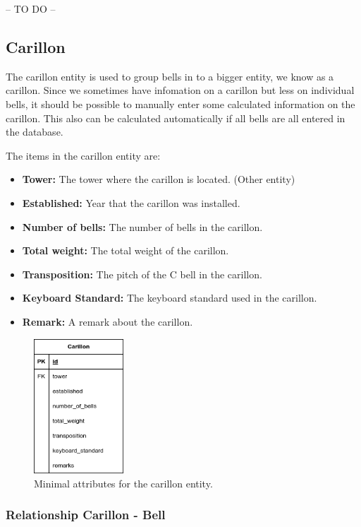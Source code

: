 \documentclass[11pt, a4paper]{article}
\begin{document}
-- TO DO --

\subsection{Carillon}

The carillon entity is used to group bells in to a bigger entity, we know as a carillon. Since we sometimes have infomation on a carillon but less on individual bells,
it should be possible to manually enter some calculated information on the carillon.
This also can be calculated automatically if all bells are all entered in the database. 

The items in the carillon entity are:

\begin{itemize}
    \item \textbf{Tower:} The tower where the carillon is located. (Other entity)
    \item \textbf{Established:} Year that the carillon was installed.
    \item \textbf{Number of bells:} The number of bells in the carillon.
    \item \textbf{Total weight:} The total weight of the carillon.
    \item \textbf{Transposition:} The pitch of the C bell in the carillon.
    \item \textbf{Keyboard Standard:} The keyboard standard used in the carillon.
    \item \textbf{Remark:} A remark about the carillon.
\end{itemize}

\begin{figure}[h!]
    \centering
    \includegraphics[width=0.3\textwidth]{images/carillon.png}
    \caption{Minimal attributes for the carillon entity.}
    \label{fig:carillon-entity}
\end{figure}

\subsubsection{Relationship Carillon - Bell}
\end{document}
